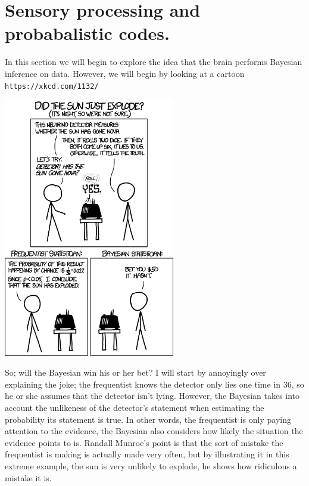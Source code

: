 \documentclass[12pt]{article}
\begin{document}
\section*{Sensory processing and probabalistic codes.}

In this section we will begin to explore the idea that the brain
performs Bayesian inference on data. However, we will begin by looking at a cartoon \texttt{https://xkcd.com/1132/}

\begin{center}
\includegraphics[width=7.5cm]{frequentists_vs_bayesians.png}
\end{center}

So; will the Bayesian win his or her bet? I will start by annoyingly
over explaining the joke; the frequentist knows the detector only lies
one time in 36, so he or she assumes that the detector isn't
lying. However, the Bayesian takes into account the unlikeness of
the detector's statement when estimating the probability its
statement is true. In other words, the frequentist is only paying
attention to the evidence, the Bayesian also considers how likely the
situation the evidence points to is. Randall Munroe's point is that
the sort of mistake the frequentist is making is actually made very
often, but by illustrating it in this extreme example, the sun is very
unlikely to explode, he shows how ridiculous a mistake it is. 
\end{document}
